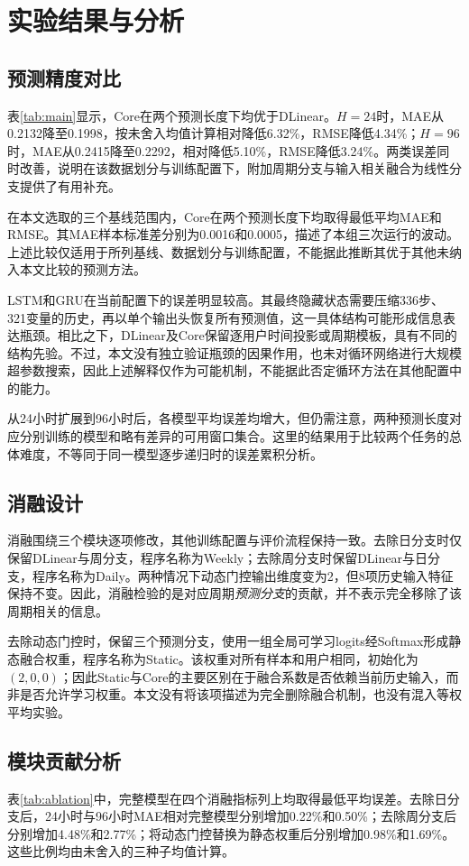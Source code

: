 \documentclass[UTF8,a4paper,zihao=5,fontset=windows]{ctexart}
\begin{document}
\section{实验结果与分析}
\subsection{预测精度对比}

表\ref{tab:main}显示，Core在两个预测长度下均优于DLinear。$H=24$时，MAE从0.2132降至0.1998，按未舍入均值计算相对降低6.32\%，RMSE降低4.34\%；$H=96$时，MAE从0.2415降至0.2292，相对降低5.10\%，RMSE降低3.24\%。两类误差同时改善，说明在该数据划分与训练配置下，附加周期分支与输入相关融合为线性分支提供了有用补充。

在本文选取的三个基线范围内，Core在两个预测长度下均取得最低平均MAE和RMSE。其MAE样本标准差分别为0.0016和0.0005，描述了本组三次运行的波动。上述比较仅适用于所列基线、数据划分与训练配置，不能据此推断其优于其他未纳入本文比较的预测方法。

LSTM和GRU在当前配置下的误差明显较高。其最终隐藏状态需要压缩336步、321变量的历史，再以单个输出头恢复所有预测值，这一具体结构可能形成信息表达瓶颈。相比之下，DLinear及Core保留逐用户时间投影或周期模板，具有不同的结构先验。不过，本文没有独立验证瓶颈的因果作用，也未对循环网络进行大规模超参数搜索，因此上述解释仅作为可能机制，不能据此否定循环方法在其他配置中的能力。

从24小时扩展到96小时后，各模型平均误差均增大，但仍需注意，两种预测长度对应分别训练的模型和略有差异的可用窗口集合。这里的结果用于比较两个任务的总体难度，不等同于同一模型逐步递归时的误差累积分析。

\subsection{消融设计}
消融围绕三个模块逐项修改，其他训练配置与评价流程保持一致。去除日分支时仅保留DLinear与周分支，程序名称为Weekly；去除周分支时保留DLinear与日分支，程序名称为Daily。两种情况下动态门控输出维度变为2，但8项历史输入特征保持不变。因此，消融检验的是对应周期\emph{预测分支}的贡献，并不表示完全移除了该周期相关的信息。

去除动态门控时，保留三个预测分支，使用一组全局可学习logits经Softmax形成静态融合权重，程序名称为Static。该权重对所有样本和用户相同，初始化为$(2,0,0)$；因此Static与Core的主要区别在于融合系数是否依赖当前历史输入，而非是否允许学习权重。本文没有将该项描述为完全删除融合机制，也没有混入等权平均实验。

\subsection{模块贡献分析}

表\ref{tab:ablation}中，完整模型在四个消融指标列上均取得最低平均误差。去除日分支后，24小时与96小时MAE相对完整模型分别增加0.22\%和0.50\%；去除周分支后分别增加4.48\%和2.77\%；将动态门控替换为静态权重后分别增加0.98\%和1.69\%。这些比例均由未舍入的三种子均值计算。
\end{document}
